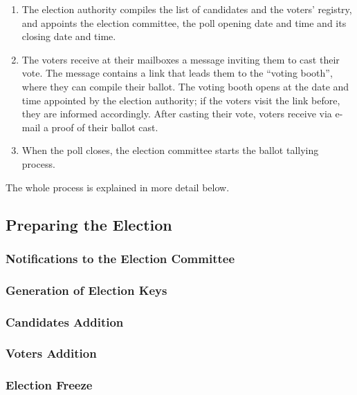 \documentclass[runningheads,a4paper]{llncs}
\begin{document}
\begin{enumerate}

\item The election authority compiles the list of candidates and the
  voters' registry, and appoints the election committee, the poll
  opening date and time and its closing date and time.

\item The voters receive at their mailboxes a message inviting them to
  cast their vote. The message contains a link that leads them to the
  ``voting booth'', where they can compile their ballot. The voting
  booth opens at the date and time appointed by the election
  authority; if the voters visit the link before, they are informed
  accordingly. After casting their vote, voters receive via e-mail a
  proof of their ballot cast.

\item When the poll closes, the election committee starts the ballot
  tallying process.

\end{enumerate}

The whole process is explained in more detail below.

\subsection{Preparing the Election}

\subsubsection{Notifications to the Election Committee}

\subsubsection{Generation of Election Keys}

\subsubsection{Candidates Addition}

\subsubsection{Voters Addition}

\subsubsection{Election Freeze}
\end{document}
